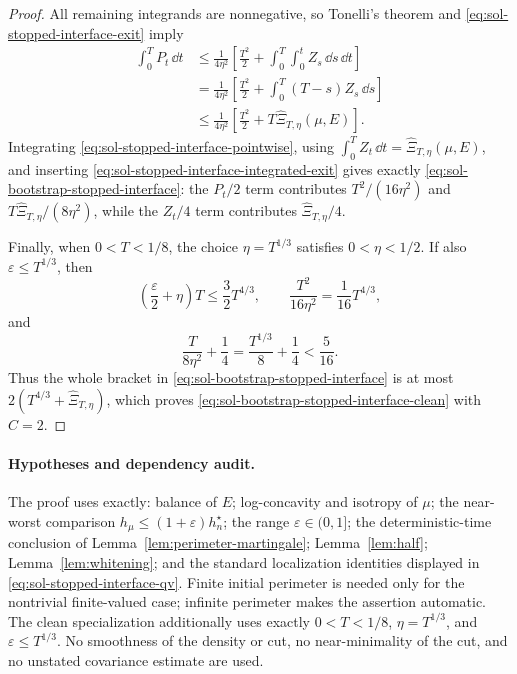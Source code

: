 \documentclass[../main.tex]{subfiles}
\begin{document}
\begin{proof}
All remaining integrands are nonnegative, so Tonelli's theorem and
\eqref{eq:sol-stopped-interface-exit} imply
\begin{equation}
\begin{split}
  \int_0^T P_t\,\dd t
  &\leq\frac1{4\eta^2}\left[
      \frac{T^2}{2}+
      \int_0^T\int_0^t Z_s\,\dd s\,\dd t\right]\\
  &=\frac1{4\eta^2}\left[
      \frac{T^2}{2}+
      \int_0^T(T-s)Z_s\,\dd s\right]\\
  &\leq\frac1{4\eta^2}\left[
      \frac{T^2}{2}+T\widehat\Xi_{T,\eta}(\mu,E)\right].
\end{split}
\label{eq:sol-stopped-interface-integrated-exit}
\end{equation}
Integrating \eqref{eq:sol-stopped-interface-pointwise}, using
$\int_0^T Z_t\,\dd t=\widehat\Xi_{T,\eta}(\mu,E)$, and inserting
\eqref{eq:sol-stopped-interface-integrated-exit} gives exactly
\eqref{eq:sol-bootstrap-stopped-interface}: the $P_t/2$ term contributes
$T^2/(16\eta^2)$ and
$T\widehat\Xi_{T,\eta}/(8\eta^2)$, while the $Z_t/4$ term contributes
$\widehat\Xi_{T,\eta}/4$.

Finally, when $0<T<1/8$, the choice $\eta=T^{1/3}$ satisfies $0<\eta<1/2$.
If also $\varepsilon\leq T^{1/3}$, then
\[
  \left(\frac\varepsilon2+\eta\right)T
     \leq\frac32T^{4/3},
  \qquad
  \frac{T^2}{16\eta^2}=\frac1{16}T^{4/3},
\]
and
\[
  \frac{T}{8\eta^2}+\frac14
  =\frac{T^{1/3}}8+\frac14<\frac5{16}.
\]
Thus the whole bracket in \eqref{eq:sol-bootstrap-stopped-interface} is at most
$2(T^{4/3}+\widehat\Xi_{T,\eta})$, which proves
\eqref{eq:sol-bootstrap-stopped-interface-clean} with $C=2$.
\end{proof}

\paragraph{Hypotheses and dependency audit.}
The proof uses exactly: balance of $E$; log-concavity and isotropy of $\mu$; the
near-worst comparison $h_\mu\leq(1+\varepsilon)h_n^\star$; the range
$\varepsilon\in(0,1]$; the deterministic-time conclusion of
Lemma~\ref{lem:perimeter-martingale}; Lemma~\ref{lem:half};
Lemma~\ref{lem:whitening}; and the standard localization identities displayed in
\eqref{eq:sol-stopped-interface-qv}.  Finite initial perimeter is needed only for the
nontrivial finite-valued case; infinite perimeter makes the assertion automatic.  The clean
specialization additionally uses exactly $0<T<1/8$, $\eta=T^{1/3}$, and
$\varepsilon\leq T^{1/3}$.  No smoothness of the density or cut, no near-minimality of the
cut, and no unstated covariance estimate are used.
\end{document}
